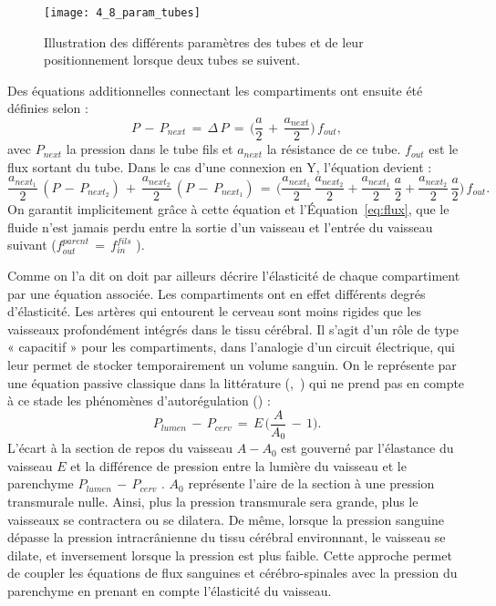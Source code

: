 \begin{figure}[!t]
\centering
\texttt{[image: 4\_8\_param\_tubes]}
\caption{Illustration des différents paramètres des tubes et de leur positionnement lorsque deux tubes se suivent.}
\label{fig:4_8_param_tubes}	
\end{figure}

Des équations additionnelles connectant les compartiments ont ensuite été définies selon :
\begin{equation}
P \,-\,P_{next}\,=\,\Delta\,P\,=\,\biggl(\frac{a}{2}\,+\,\frac{a_{next}}{2}\biggr)\,f_{out},
\end{equation}
avec $P_{next}$ la pression dans le tube fils et $a_{next}$ la résistance de ce tube. $f_{out}$ est le flux sortant du
tube. Dans le cas d’une connexion en Y, l’équation devient :
\begin{equation}
\frac{a_{next_1}}{2}\,(P\,-\,P_{next_2})\,+\,\frac{a_{next_2}}{2}\,(P\,-\,P_{next_1})\,=\,\biggl(\frac{a_{next_1}}{2}\,\frac{a_{next_2}}{2}+\frac{a_{next_1}}{2}\,\frac{a}{2}+\frac{a_{next_2}}{2}\,\frac{a}{2}\biggr)\,f_{out}.
\end{equation}
On garantit implicitement grâce à cette équation et l’Équation~\ref{eq:flux}, que le fluide n’est jamais perdu
entre la sortie d’un vaisseau et l’entrée du vaisseau suivant ($f_{out}^{parent}\, = \, f_{in}^{fils}$ ).

Comme on l’a dit on doit par ailleurs décrire l’élasticité de chaque compartiment par une
équation associée. Les compartiments ont en effet différents degrés d’élasticité. Les artères qui
entourent le cerveau sont moins rigides que les vaisseaux profondément intégrés dans le tissu
cérébral. Il s’agit d’un rôle de type « capacitif » pour les compartiments, dans l’analogie d’un circuit
électrique, qui leur permet de stocker temporairement un volume sanguin. On le représente par une
équation passive classique dans la littérature  (\cite{Zagzoule1986},~\cite{Linninger2009}) qui ne prend pas en compte à ce stade les
phénomènes d’autorégulation (\cite{Paulson1990}) :
\begin{equation}
P_{lumen}\,-\,P_{cerv}\,=\,E\,\biggl(\frac{A}{A_0}\,-\,1\biggr).
\end{equation}
L’écart à la section de repos du vaisseau $A-A_0 $ est gouverné par l’élastance du vaisseau $E$ et la
différence de pression entre la lumière du vaisseau et le parenchyme $P_{lumen}\,-\,P_{cerv}$ . $A_0$
représente l’aire de la section à une pression transmurale nulle. Ainsi, plus la pression transmurale
sera grande, plus le vaisseaux se contractera ou se dilatera. De même, lorsque la pression sanguine
dépasse la pression intracrânienne du tissu cérébral environnant, le vaisseau se dilate, et inversement
lorsque la pression est plus faible. Cette approche permet de coupler les équations de flux sanguines
et cérébro-spinales avec la pression du parenchyme en prenant en compte l’élasticité du vaisseau.

